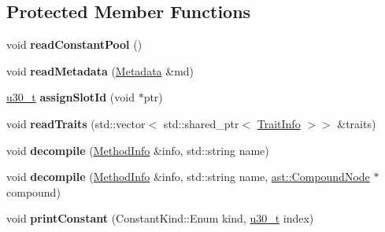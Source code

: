 \subsection*{Protected Member Functions}
\begin{DoxyCompactItemize}
\item 
\hypertarget{classjswf_1_1avm2_1_1_a_b_c_file_af91b0fd52780d10f3fe16da29a8c4d96}{void {\bfseries read\+Constant\+Pool} ()}\label{classjswf_1_1avm2_1_1_a_b_c_file_af91b0fd52780d10f3fe16da29a8c4d96}

\item 
\hypertarget{classjswf_1_1avm2_1_1_a_b_c_file_ab38ac600249d820785f0a303125bc079}{void {\bfseries read\+Metadata} (\hyperlink{structjswf_1_1avm2_1_1_metadata}{Metadata} \&md)}\label{classjswf_1_1avm2_1_1_a_b_c_file_ab38ac600249d820785f0a303125bc079}

\item 
\hypertarget{classjswf_1_1avm2_1_1_a_b_c_file_a2007fc0239c334716fcce5f9bfe26fed}{\hyperlink{namespacejswf_aa10d9ddca2a6a5debdc261dfae3d1117}{u30\+\_\+t} {\bfseries assign\+Slot\+Id} (void $\ast$ptr)}\label{classjswf_1_1avm2_1_1_a_b_c_file_a2007fc0239c334716fcce5f9bfe26fed}

\item 
\hypertarget{classjswf_1_1avm2_1_1_a_b_c_file_a5f849f46651029195b7fca76b9db38a1}{void {\bfseries read\+Traits} (std\+::vector$<$ std\+::shared\+\_\+ptr$<$ \hyperlink{structjswf_1_1avm2_1_1_trait_info}{Trait\+Info} $>$$>$ \&traits)}\label{classjswf_1_1avm2_1_1_a_b_c_file_a5f849f46651029195b7fca76b9db38a1}

\item 
\hypertarget{classjswf_1_1avm2_1_1_a_b_c_file_af3d29c9cf057377bb16335ebcafcc1bf}{void {\bfseries decompile} (\hyperlink{structjswf_1_1avm2_1_1_method_info}{Method\+Info} \&info, std\+::string name)}\label{classjswf_1_1avm2_1_1_a_b_c_file_af3d29c9cf057377bb16335ebcafcc1bf}

\item 
\hypertarget{classjswf_1_1avm2_1_1_a_b_c_file_a6a8283d965a87b33e70e7b44ffe3c216}{void {\bfseries decompile} (\hyperlink{structjswf_1_1avm2_1_1_method_info}{Method\+Info} \&info, std\+::string name, \hyperlink{classjswf_1_1avm2_1_1ast_1_1_compound_node}{ast\+::\+Compound\+Node} $\ast$compound)}\label{classjswf_1_1avm2_1_1_a_b_c_file_a6a8283d965a87b33e70e7b44ffe3c216}

\item 
\hypertarget{classjswf_1_1avm2_1_1_a_b_c_file_a326cd3e96116e380bc49bab7517768cb}{void {\bfseries print\+Constant} (Constant\+Kind\+::\+Enum kind, \hyperlink{namespacejswf_aa10d9ddca2a6a5debdc261dfae3d1117}{u30\+\_\+t} index)}\label{classjswf_1_1avm2_1_1_a_b_c_file_a326cd3e96116e380bc49bab7517768cb}


\end{DoxyCompactItemize}
